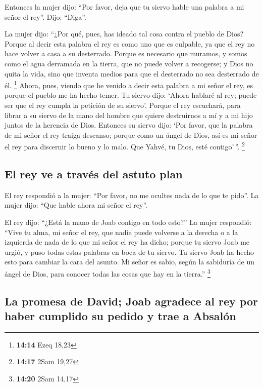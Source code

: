  Entonces la mujer dijo: ``Por favor, deja que tu siervo
hable una palabra a mi señor el rey''. Dijo: ``Diga''.

 La mujer dijo: ``¿Por qué, pues, has ideado tal cosa
contra el pueblo de Dios? Porque al decir esta palabra el rey es como
uno que es culpable, ya que el rey no hace volver a casa a su
desterrado.  Porque es necesario que muramos, y somos
como el agua derramada en la tierra, que no puede volver a recogerse; y
Dios no quita la vida, sino que inventa medios para que el desterrado no
sea desterrado de él. \footnote{\textbf{14:14} Ezeq 18,23}
 Ahora, pues, viendo que he venido a decir esta palabra a
mi señor el rey, es porque el pueblo me ha hecho temer. Tu siervo dijo:
`Ahora hablaré al rey; puede ser que el rey cumpla la petición de su
siervo'.  Porque el rey escuchará, para librar a su
siervo de la mano del hombre que quiere destruirnos a mí y a mi hijo
juntos de la herencia de Dios.  Entonces su siervo dijo:
`Por favor, que la palabra de mi señor el rey traiga descanso; porque
como un ángel de Dios, así es mi señor el rey para discernir lo bueno y
lo malo. Que Yahvé, tu Dios, esté contigo'\,''. \footnote{\textbf{14:17}
  2Sam 19,27}

\hypertarget{el-rey-ve-a-travuxe9s-del-astuto-plan}{%
\subsection{El rey ve a través del astuto
plan}\label{el-rey-ve-a-travuxe9s-del-astuto-plan}}

 El rey respondió a la mujer: ``Por favor, no me ocultes
nada de lo que te pido''. La mujer dijo: ``Que hable ahora mi señor el
rey''.

 El rey dijo: ``¿Está la mano de Joab contigo en todo
esto?'' La mujer respondió: ``Vive tu alma, mi señor el rey, que nadie
puede volverse a la derecha o a la izquierda de nada de lo que mi señor
el rey ha dicho; porque tu siervo Joab me urgió, y puso todas estas
palabras en boca de tu siervo.  Tu siervo Joab ha hecho
esto para cambiar la cara del asunto. Mi señor es sabio, según la
sabiduría de un ángel de Dios, para conocer todas las cosas que hay en
la tierra.'' \footnote{\textbf{14:20} 2Sam 14,17}

\hypertarget{la-promesa-de-david-joab-agradece-al-rey-por-haber-cumplido-su-pedido-y-trae-a-absaluxf3n}{%
\subsection{La promesa de David; Joab agradece al rey por haber cumplido
su pedido y trae a
Absalón}\label{la-promesa-de-david-joab-agradece-al-rey-por-haber-cumplido-su-pedido-y-trae-a-absaluxf3n}}

